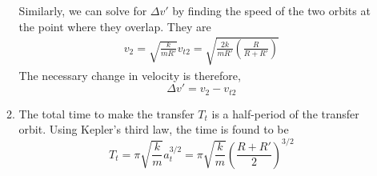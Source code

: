 \documentclass[usletter, 12pt]{article}
\begin{document}
\begin{enumerate}[leftmargin=0em, label=\textbf{\arabic*}.]
\begin{enumerate}[leftmargin=2em, label=(\textbf{\alph*})]
      Similarly, we can solve for $\Delta v'$ by finding the speed of the two
      orbits at the point where they overlap. They are
      \begin{align}
        v_2 = \sqrt{\frac{k}{mR'}}
        v_{t2} = \sqrt{\frac{2k}{mR'}\left( \frac{R}{R+R'} \right)}
      \end{align}
      The necessary change in velocity is therefore,
      \begin{equation}
        \Delta v' = v_2-v_{t2}
      \end{equation}
      
    \item The total time to make the transfer $T_t$ is a half-period of the
      transfer orbit. Using Kepler's third law, the time is found to be
      \begin{equation}
        T_t = \pi \sqrt{\frac{k}{m}}a_t^{3/2} = \pi\sqrt{\frac{k}{m}}\left( \frac{R+R'}{2} \right)^{3/2}
      \end{equation}
      
    \end{enumerate}
\end{enumerate}
\end{document}
